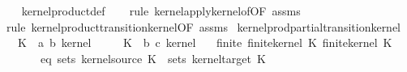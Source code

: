 \begin{isabellebody}
%
\isadelimproof
\ \ %
\endisadelimproof
%
\isatagproof
{}\isamarkupfalse%
\ kernel{\isacharunderscore}{\kern0pt}product{\isacharunderscore}{\kern0pt}def\isanewline
\ \ \isamarkupfalse%
\ {\isacharparenleft}{\kern0pt}rule\ kernel{\isacharunderscore}{\kern0pt}apply{\isacharunderscore}{\kern0pt}kernel{\isacharunderscore}{\kern0pt}of{\isacharbrackleft}{\kern0pt}OF\ assms{\isacharparenleft}{\kern0pt}{}{\isacharcomma}{\kern0pt}{}{\isacharparenright}{\kern0pt}{\isacharbrackright}{\kern0pt}{\isacharparenright}{\kern0pt}\isanewline
\ \ \isamarkupfalse%
\ {\isacharparenleft}{\kern0pt}rule\ kernel{\isacharunderscore}{\kern0pt}product{\isacharunderscore}{\kern0pt}transition{\isacharunderscore}{\kern0pt}kernel{\isacharbrackleft}{\kern0pt}OF\ assms{\isacharparenleft}{\kern0pt}{}{\isacharminus}{\kern0pt}{}{\isacharparenright}{\kern0pt}{\isacharbrackright}{\kern0pt}{\isacharparenright}{\kern0pt}%
\endisatagproof
{\isafoldproof}%
%
\isadelimproof
\isanewline
%
\endisadelimproof
\isanewline
{}\isamarkupfalse%
\ kernel{\isacharunderscore}{\kern0pt}prod{\isacharunderscore}{\kern0pt}partial{\isacharunderscore}{\kern0pt}transition{\isacharunderscore}{\kern0pt}kernel{\isacharcolon}{\kern0pt}\isanewline
\ \ \ K{\isacharunderscore}{\kern0pt}{}\ {\isacharcolon}{\kern0pt}{\isacharcolon}{\kern0pt}\ {\isachardoublequoteopen}{\isacharparenleft}{\kern0pt}{\isacharprime}{\kern0pt}a{\isacharcomma}{\kern0pt}\ {\isacharprime}{\kern0pt}b{\isacharparenright}{\kern0pt}\ kernel{\isachardoublequoteclose}\isanewline
\ \ \ \ \ K{\isacharunderscore}{\kern0pt}{}\ {\isacharcolon}{\kern0pt}{\isacharcolon}{\kern0pt}\ {\isachardoublequoteopen}{\isacharparenleft}{\kern0pt}{\isacharprime}{\kern0pt}b{\isacharcomma}{\kern0pt}\ {\isacharprime}{\kern0pt}c{\isacharparenright}{\kern0pt}\ kernel{\isachardoublequoteclose}\isanewline
\ \ \ finite{\isacharcolon}{\kern0pt}\ {\isachardoublequoteopen}finite{\isacharunderscore}{\kern0pt}kernel\ K{\isacharunderscore}{\kern0pt}{}{\isachardoublequoteclose}\ {\isachardoublequoteopen}finite{\isacharunderscore}{\kern0pt}kernel\ K{\isacharunderscore}{\kern0pt}{}{\isachardoublequoteclose}\isanewline
\ \ \ \ \ \ \ eq{\isacharcolon}{\kern0pt}\ {\isachardoublequoteopen}sets\ {\isacharparenleft}{\kern0pt}kernel{\isacharunderscore}{\kern0pt}source\ K{\isacharunderscore}{\kern0pt}{}{\isacharparenright}{\kern0pt}\ {\isacharequal}{\kern0pt}\ sets\ {\isacharparenleft}{\kern0pt}kernel{\isacharunderscore}{\kern0pt}target\ K{\isacharunderscore}{\kern0pt}{}{\isacharparenright}{\kern0pt}{\isachardoublequoteclose}\isanewline

\end{isabellebody}
